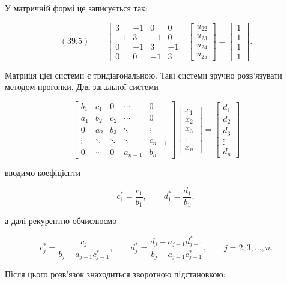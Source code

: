 \documentclass[
  ukrainian,
]{article}
\begin{document}
У матричній формі це записується так:

\[(39.5)\qquad\begin{bmatrix}3 & -1 & 0 & 0\\-1 & 3 & -1 & 0\\0 & -1 & 3 & -1\\0 & 0 & -1 & 3\end{bmatrix}\begin{bmatrix}u_{22}\\u_{23}\\u_{24}\\u_{25}\end{bmatrix}=\begin{bmatrix}1\\1\\1\\1\end{bmatrix}.\]

Матриця цієї системи є тридіагональною. Такі системи зручно розв'язувати
методом прогонки. Для загальної системи

\[\begin{bmatrix}b_1 & c_1 & 0 & \cdots & 0\\a_1 & b_2 & c_2 & \cdots & 0\\0 & a_2 & b_3 & \ddots & \vdots\\\vdots & \ddots & \ddots & \ddots & c_{n-1}\\0 & \cdots & 0 & a_{n-1} & b_n\end{bmatrix}\begin{bmatrix}x_1\\x_2\\x_3\\\vdots\\x_n\end{bmatrix}=\begin{bmatrix}d_1\\d_2\\d_3\\\vdots\\d_n\end{bmatrix}\]

вводимо коефіцієнти

\[c_1^*=\frac{c_1}{b_1},\qquad d_1^*=\frac{d_1}{b_1},\]

а далі рекурентно обчислюємо

\[c_j^*=\frac{c_j}{b_j-a_{j-1}c_{j-1}^*},\qquad d_j^*=\frac{d_j-a_{j-1}d_{j-1}^*}{b_j-a_{j-1}c_{j-1}^*},\qquad j=2,3,\dots,n.\]

Після цього розв'язок знаходиться зворотною підстановкою:
\end{document}
